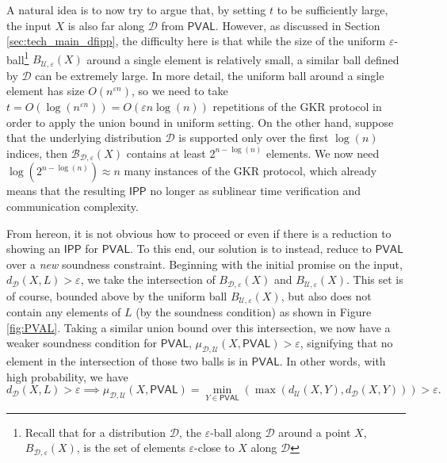 \documentclass[11pt]{article}
\newcommand{\PVAL}{\mathsf{PVAL}}
\newcommand{\IPP}{\mathsf{IPP}}
\newcommand{\sU}{\mathcal{U}}
\newcommand{\sD}{\mathcal{D}}
\newcommand{\sB}{\mathcal{B}}
\begin{document}
A natural idea is to now try to argue that, by setting $t$ to be sufficiently large, the input $X$ is also far along $\mathcal{D}$ from $\PVAL$.  However, as discussed in Section \ref{sec:tech_main_dfipp}, the difficulty here is that while the size of the uniform $\varepsilon$-ball\footnote{Recall that for a distribution $\mathcal{D}$, the $\varepsilon$-ball along $\mathcal{D}$ around a point $X$, $B_{\mathcal{D}, \varepsilon}(X)$, is the set of elements $\varepsilon$-close to $X$ along $\mathcal{D}$} $B_{\sU,\varepsilon}(X)$ around a single element is relatively small, a similar ball defined by $\mathcal{D}$ can be extremely large. In more detail, the uniform ball around a single element has size $O(n^{\varepsilon n})$, so we need to take $t = O(\log (n^{\varepsilon n}))=O(\varepsilon n\log (n))$ repetitions of the GKR protocol in order to apply the union bound in uniform setting. On the other hand, suppose that the underlying distribution $\sD$ is supported only over the first $\log(n)$ indices, then $\sB_{\sD,\varepsilon}(X)$ contains at least $2^{n-\log(n)}$ elements. We now need $\log (2^{n-\log (n)})\approx n$ many instances of the GKR protocol, which already means that the resulting $\IPP$ no longer as sublinear time verification and communication complexity. 


From hereon, it is not obvious how to proceed or even if there is a reduction to showing an $\IPP$ for $\PVAL$. To this end, our solution is to  instead, reduce to $\PVAL$ over a \textit{new} soundness constraint. Beginning with the initial promise on the input, $d_{\mathcal{D}}(X, L)>\varepsilon$, we take the intersection of $B_{\sD,\varepsilon}(X)$ and $B_{\sU,\varepsilon}(X)$. This set is of course, bounded above by the uniform ball $B_{\sU,\varepsilon}(X)$, but also does not contain any elements of $L$ (by the soundness condition) as shown in Figure \ref{fig:PVAL}. Taking a similar union bound over this intersection, we now have a weaker soundness condition for $\PVAL$, $\mu_{\mathcal{D}, \mathcal{U}}(X, \PVAL)>\varepsilon$, signifying that no element in the intersection of those two balls is in $\PVAL$. In other words, with high probability, we have 
\begin{equation*}
    d_{\mathcal{D}}(X,L)>\varepsilon\implies \mu_{\mathcal{D}, \mathcal{U}}(X,\PVAL) = \min_{Y\in \PVAL} \left(\max (d_{\mathcal{U}}(X,Y), d_{\mathcal{D}}(X,Y)) \right) > \varepsilon.
\end{equation*} 
\end{document}
